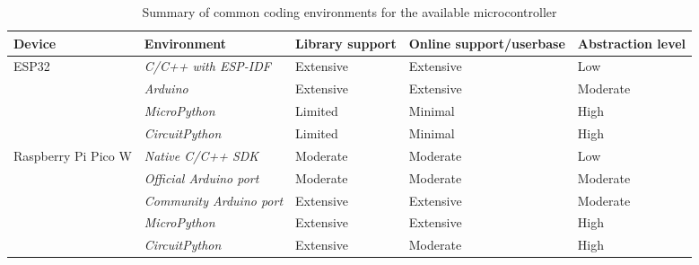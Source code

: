 \documentclass[class=report,11pt,crop=false]{standalone}
\begin{document}
\begin{table}[ht]
    \centering
    \begin{scriptsize}
    \begin{tabularx}{0.7\textwidth}{|b{}|p{}|X|X|X|}
    \hline
    \textbf{Device}                      & \textbf{Environment}        & \textbf{Library support} & \textbf{Online support/userbase} & \textbf{Abstraction level} \\ \hline
    \multirow{4}{0.08\textwidth}{ESP32}              & \color{black} \textit{C/C++ with ESP-IDF} & \color{ForestGreen} Extensive  & \color{ForestGreen} Extensive & \color{red} Low \\ \cline{2-5} 
                                         & \color{black} \textit{Arduino}            & \color{ForestGreen} Extensive  & \color{ForestGreen} Extensive & \color{ForestGreen} Moderate \\ \cline{2-5} 
                                         & \color{black} \textit{MicroPython}        & \color{red} Limited & \color{red} Minimal & \color{CadetBlue} High \\ \cline{2-5} 
                                         & \color{black} \textit{CircuitPython}      & \color{red} Limited & \color{red} Minimal  & \color{CadetBlue} High \\ \hline
    \multirow{5}{0.08\textwidth}{Raspberry Pi Pico W} & \color{black} \textit{Native C/C++ SDK}   & \color{CadetBlue} Moderate  & \color{CadetBlue} Moderate & \color{red} Low\\ \cline{2-5} 
                                         & \color{black} \textit{Official Arduino port}  & \color{CadetBlue} Moderate & \color{CadetBlue} Moderate & \color{ForestGreen} Moderate \\ \cline{2-5} 
                                         & \color{black} \textit{Community Arduino port}  & \color{ForestGreen} Extensive & \color{ForestGreen} Extensive & \color{ForestGreen} Moderate \\ \cline{2-5} 
                                         & \color{black} \textit{MicroPython}        & \color{ForestGreen} Extensive  & \color{ForestGreen} Extensive & \color{CadetBlue} High \\ \cline{2-5} 
                                         & \color{black} \textit{CircuitPython}      & \color{ForestGreen} Extensive & \color{CadetBlue} Moderate & \color{CadetBlue} High \\ \hline
    \end{tabularx}%
    \end{scriptsize}
    \caption{Summary of common coding environments for the available microcontroller}
    \label{tab:coding-env}
\end{table}
\end{document}
